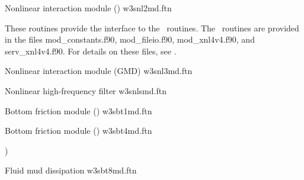 \begin{flisti}
\end{flisti}

\noindent
Nonlinear interaction module (\xnl) \hfill {\file w3snl2md.ftn}

\begin{flisti}
\end{flisti}
These routines provide the interface to the \xnl\ routines. The \xnl\ routines
are provided in the files {\file mod\_constants.f90}, {\file mod\_fileio.f90},
{\file mod\_xnl4v4.f90}, and {\file serv\_xnl4v4.f90}. For details on these
files, see \cite{rep:vVl02b}.

\vspace{\baselineskip}
\noindent
Nonlinear interaction module (GMD) \hfill {\file w3snl3md.ftn}

\begin{flisti}
\end{flisti}

\vspace{\baselineskip}
\noindent
Nonlinear high-frequency filter \hfill {\file w3snlsmd.ftn}

\begin{flisti}
\end{flisti}

\noindent
Bottom friction module (\js) \hfill {\file w3sbt1md.ftn}

\begin{flisti}
\end{flisti}

\noindent
Bottom friction module (\showex) \hfill {\file w3sbt4md.ftn}

\begin{flisti}
)
\end{flisti}

\noindent
Fluid mud dissipation \citep{art:DL78}  \hfill {\file w3sbt8md.ftn}

